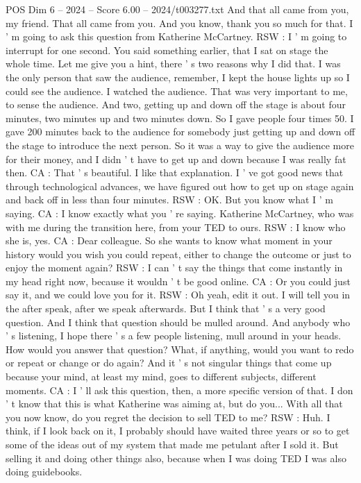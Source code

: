 \begin{textsample}{POS Dim 6 – 2024 – Score 6.00 – 2024/t003277.txt}
And that all came from you, my friend.
That all came from you.
And you know, thank you so much for that.
I ' m going to ask this question from Katherine McCartney.
RSW : I ' m going to interrupt for one second.
You said something earlier, that I sat on stage the whole time.
Let me give you a hint, there ' s two reasons why I did that.
I was the only person that saw the audience, remember, I kept the house lights up so I could see the audience.
I watched the audience.
That was very important to me, to sense the audience.
And two, getting up and down off the stage is about four minutes, two minutes up and two minutes down.
So I gave people four times 50.
I gave 200 minutes back to the audience for somebody just getting up and down off the stage to introduce the next person.
So it was a way to give the audience more for their money, and I didn ' t have to get up and down because I was really fat then.
CA : That ' s beautiful.
I like that explanation.
I ' ve got good news that through technological advances, we have figured out how to get up on stage again and back off in less than four minutes.
RSW : OK.
But you know what I ' m saying.
CA : I know exactly what you ' re saying.
Katherine McCartney, who was with me during the transition here, from your TED to ours.
RSW : I know who she is, yes.
CA : Dear colleague.
So she wants to know what moment in your history would you wish you could repeat, either to change the outcome or just to enjoy the moment again?
RSW : I can ' t say the things that come instantly in my head right now, because it wouldn ' t be good online.
CA : Or you could just say it, and we could love you for it.
RSW : Oh yeah, edit it out.
I will tell you in the after speak, after we speak afterwards.
But I think that ' s a very good question.
And I think that question should be mulled around.
And anybody who ' s listening, I hope there ' s a few people listening, mull around in your heads.
How would you answer that question?
What, if anything, would you want to redo or repeat or change or do again?
And it ' s not singular things that come up because your mind, at least my mind, goes to different subjects, different moments.
CA : I ' ll ask this question, then, a more specific version of that.
I don ' t know that this is what Katherine was aiming at, but do you...
With all that you now know, do you regret the decision to sell TED to me?
RSW : Huh.
I think, if I look back on it, I probably should have waited three years or so to get some of the ideas out of my system that made me petulant after I sold it.
But selling it and doing other things also, because when I was doing TED I was also doing guidebooks.

\end{textsample}
